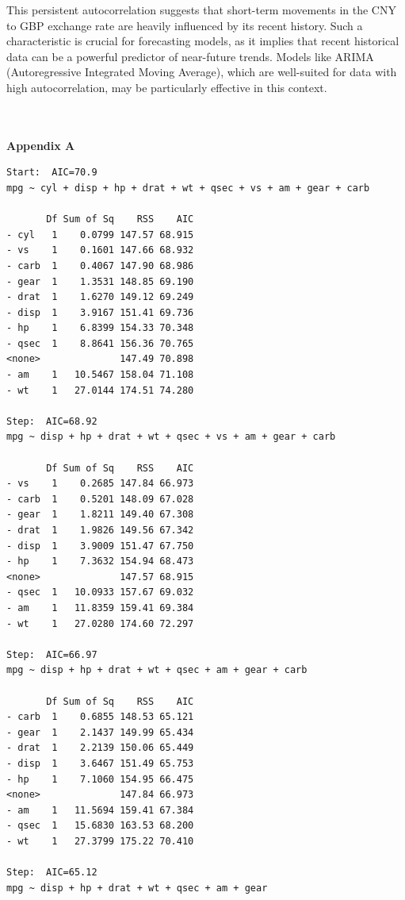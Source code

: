 \documentclass{article}\usepackage[]{graphicx}\usepackage[]{xcolor}
\begin{document}
\noindent
This persistent autocorrelation suggests that short-term movements in the CNY to GBP exchange rate are heavily influenced by its recent history. Such a characteristic is crucial for forecasting models, as it implies that recent historical data can be a powerful predictor of near-future trends. Models like ARIMA (Autoregressive Integrated Moving Average), which are well-suited for data with high autocorrelation, may be particularly effective in this context.




\newpage 

\\  
\\  
{\Large \textbf{Appendix A}}
\begin{verbatim}
Start:  AIC=70.9
mpg ~ cyl + disp + hp + drat + wt + qsec + vs + am + gear + carb

       Df Sum of Sq    RSS    AIC
- cyl   1    0.0799 147.57 68.915
- vs    1    0.1601 147.66 68.932
- carb  1    0.4067 147.90 68.986
- gear  1    1.3531 148.85 69.190
- drat  1    1.6270 149.12 69.249
- disp  1    3.9167 151.41 69.736
- hp    1    6.8399 154.33 70.348
- qsec  1    8.8641 156.36 70.765
<none>              147.49 70.898
- am    1   10.5467 158.04 71.108
- wt    1   27.0144 174.51 74.280

Step:  AIC=68.92
mpg ~ disp + hp + drat + wt + qsec + vs + am + gear + carb

       Df Sum of Sq    RSS    AIC
- vs    1    0.2685 147.84 66.973
- carb  1    0.5201 148.09 67.028
- gear  1    1.8211 149.40 67.308
- drat  1    1.9826 149.56 67.342
- disp  1    3.9009 151.47 67.750
- hp    1    7.3632 154.94 68.473
<none>              147.57 68.915
- qsec  1   10.0933 157.67 69.032
- am    1   11.8359 159.41 69.384
- wt    1   27.0280 174.60 72.297

Step:  AIC=66.97
mpg ~ disp + hp + drat + wt + qsec + am + gear + carb

       Df Sum of Sq    RSS    AIC
- carb  1    0.6855 148.53 65.121
- gear  1    2.1437 149.99 65.434
- drat  1    2.2139 150.06 65.449
- disp  1    3.6467 151.49 65.753
- hp    1    7.1060 154.95 66.475
<none>              147.84 66.973
- am    1   11.5694 159.41 67.384
- qsec  1   15.6830 163.53 68.200
- wt    1   27.3799 175.22 70.410

Step:  AIC=65.12
mpg ~ disp + hp + drat + wt + qsec + am + gear


\end{verbatim}
\end{document}
